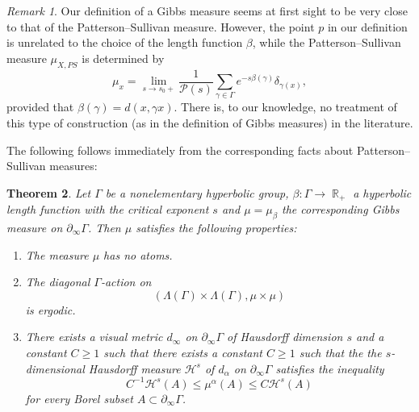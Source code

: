\documentclass[12pt]{amsbook}%
\newtheorem{thm}{Theorem}[chapter]
\theoremstyle{definition}
\theoremstyle{remark}
\newtheorem{rem}[thm]{Remark}
\numberwithin{section}{chapter}
\numberwithin{subsection}{section}
\numberwithin{figure}{chapter}
\DeclareMathOperator{\R}{\mathbb{R}}
\def\cP{{\mathscr{P}}}
\def\Ga{\Gamma}
\def\La{\Lambda}
\def\al{\alpha}
\def\geo{\partial_\infty}
\begin{document}
{{\begin{rem}
Our definition of a Gibbs measure seems at first sight to be very close to that of the  Patterson--Sullivan measure. 
However, the point $p$ in our definition is unrelated to the choice of the length function $\beta$, while the Patterson--Sullivan measure 
$\mu_{X,PS}$ is determined by  
\[\mu_{x}= \lim_{s\to s_0+} \frac{1}{\cP(s)}\sum_{\gamma\in \Gamma}e^{-s \beta(\gamma)}\delta_{\gamma(x)},\]
provided that $\beta(\gamma)=d(x, \gamma x)$. There is, to our knowledge, no treatment of this type of construction (as in the definition of Gibbs measures) in the literature. 
\end{rem}


The following follows immediately from the corresponding facts about Patterson--Sullivan measures:

\begin{thm}\label{thm:Gibbs list}
Let $\Ga$ be a nonelementary hyperbolic group, $\beta: \Ga\to \R_+$ a hyperbolic length function with the critical exponent $s$ and $\mu=\mu_\beta$ the corresponding Gibbs measure on $\geo \Ga$. Then $\mu$ satisfies the following properties:

\begin{enumerate}
\item The measure $\mu$ has no atoms. 

\item The diagonal $\Ga$-action  on 
$$(\La(\Ga)\times \La(\Ga), \mu\times \mu)$$ 
is ergodic. 


\item There exists a visual metric $d_\infty$ on $\geo \Ga$ of Hausdorff dimension $s$ and a constant $C\geqslant 1$ 
such that there exists a constant $C\geqslant 1$ such that the the $s$-dimensional Hausdorff measure ${\mathcal H}^s$ 
of $d_\al$ on $\geo \Ga$ satisfies the inequality 
$$
C^{-1}{\mathcal H}^{s}(A)\leqslant \mu^\al(A)\leqslant C{\mathcal H}^{s}(A)
$$
for every Borel subset $A\subset \geo\Ga$. 


\end{enumerate}
\end{thm}}}
\end{document}
